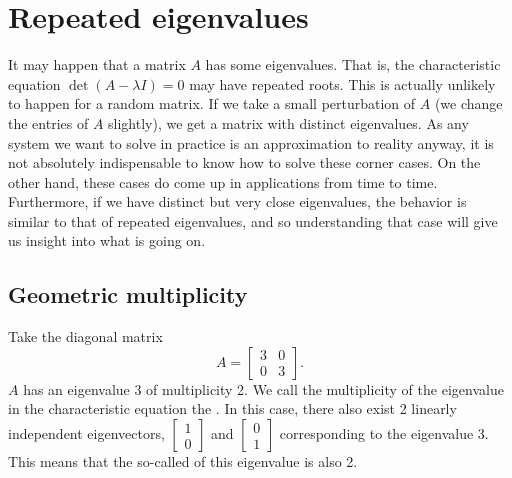 
\sectionnewpage
\section{Repeated eigenvalues} \label{sec:multeigen}



It may happen that a matrix $A$ has some  eigenvalues.
That is, the characteristic equation $\det(A-\lambda I) = 0$ may have
repeated roots.  This is actually unlikely to happen
for a random matrix.  If we take a small perturbation of $A$ (we change the
entries of $A$ slightly), we get a matrix with distinct eigenvalues.  As
any system we want to solve in practice is an approximation to reality
anyway, it is not absolutely indispensable to know how to solve these
corner cases.  
On the other hand, these cases do come up in applications from time to time.
Furthermore, if we have distinct but very close eigenvalues, the behavior is
similar to that of repeated eigenvalues, and so understanding that case
will give us insight into what is going on.

\subsection{Geometric multiplicity}

Take the diagonal matrix
\begin{equation*}
A =
\begin{bmatrix}
3 & 0 \\ 0 & 3
\end{bmatrix} .
\end{equation*}
$A$ has an eigenvalue 3 of multiplicity 2.  We call the
multiplicity of the eigenvalue
in the characteristic equation the
\emph{}.  In this case, there also exist 2
linearly
independent eigenvectors,
$\left[ \begin{smallmatrix} 1 \\ 0 \end{smallmatrix} \right]$
and
$\left[ \begin{smallmatrix} 0 \\ 1 \end{smallmatrix} \right]$ corresponding
to the eigenvalue 3.  This means
that the so-called \emph{}
of this eigenvalue is also 2.

